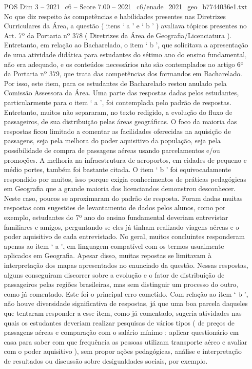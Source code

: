 \begin{textsample}{POS Dim 3 – 2021\_c6 – Score 7.00 – 2021\_c6/enade\_2021\_geo\_b7744036e1.txt}
No que diz respeito às competências e habilidades presentes nas Diretrizes Curriculares da Área, a questão ( itens ‘ a ’ e ‘ b ’ ) avaliava tópicos presentes no Art. 7º da Portaria nº 378 ( Diretrizes da Área de Geografia/Licenciatura ).
Entretanto, em relação ao Bacharelado, o item ‘ b ’, que solicitava a apresentação de uma atividade didática para estudantes do sétimo ano do ensino fundamental, não era adequado, e os conteúdos necessários não são contemplados no artigo 6º da Portaria nº 379, que trata das competências dos formandos em Bacharelado.
Por isso, este item, para os estudantes de Bacharelado restou anulado pela Comissão Assessora da Área.
Uma parte das respostas dadas pelos estudantes, particularmente para o item ‘ a ’, foi contemplada pelo padrão de respostas.
Entretanto, muitos não separaram, no texto redigido, a evolução do fluxo de passageiros, de sua distribuição pelas áreas geográficas.
O foco da maioria das respostas ficou limitado a comentar as facilidades oferecidas na aquisição de passagens, seja pela melhora do poder aquisitivo da população, seja pela possibilidade de compra de passagens aéreas usando parcelamentos e/ou promoções.
A melhoria na infraestrutura de aeroportos, em cidades de pequeno e médio portes, também foi bastante citada.
O item ‘ b ’ foi equivocadamente respondido por muitos, isso porque exigia conhecimentos de práticas pedagógicas em Geografia que a grande maioria dos licenciandos demonstrou desconhecer.
Neste caso, poucos se aproximaram do padrão de resposta.
Foram dadas muitas respostas com sugestões de levantamento de dados pelos alunos, como por exemplo, estudantes do 7º ano do ensino fundamental deveriam entrevistar familiares e amigos, perguntando se eles já tinham realizado viagens aéreas e o poder aquisitivo de cada entrevistado.
No geral, muitos concluintes responderam apenas ao item ‘ a ’, em linguagem compatível com os termos usualmente aplicados em Geografia.
Apesar disso, muitas repostas se limitavam à interpretação dos mapas apresentados no enunciado da questão.
Nessas respostas, alguns conseguiram discorrer sobre a evolução e o fator de distribuição de passageiros pelas regiões brasileiras, mas sem distinguir um processo do outro, como já comentado.
Este foi o principal erro cometido.
Com relação ao item ‘ b ’, não houve diversidade significativa de respostas, já que uma boa parcela daqueles que tentaram responder a esse item, como já comentado, sugeria atividades nas quais os estudantes deveriam realizar pesquisas de vários tipos ( de preços de passagens aéreas e comparação com o salário mínimo ; aplicar questionário em casa para saber com que frequência as pessoas utilizam transporte aéreo e avaliar com o poder aquisitivo ), sem propor ações pedagógicas, análise e interpretação de resultados ou discussão sobre desigualdades sociais, por exemplo.

\end{textsample}
